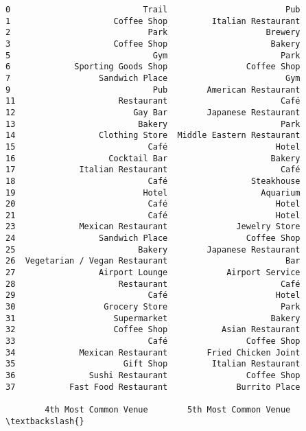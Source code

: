 \documentclass[11pt]{article}
\begin{document}
\begin{tcolorbox}[breakable, size=fbox, boxrule=.5pt, pad at break*=1mm, opacityfill=0]
\begin{Verbatim}[commandchars=\\\{\}]
0                           Trail                        Pub
1                     Coffee Shop         Italian Restaurant
2                            Park                    Brewery
3                     Coffee Shop                     Bakery
5                             Gym                       Park
6             Sporting Goods Shop                Coffee Shop
7                  Sandwich Place                        Gym
9                             Pub        American Restaurant
11                     Restaurant                       Café
12                        Gay Bar        Japanese Restaurant
13                         Bakery                       Park
14                 Clothing Store  Middle Eastern Restaurant
15                           Café                      Hotel
16                   Cocktail Bar                     Bakery
17             Italian Restaurant                       Café
18                           Café                 Steakhouse
19                          Hotel                   Aquarium
20                           Café                      Hotel
21                           Café                      Hotel
23             Mexican Restaurant              Jewelry Store
24                 Sandwich Place                Coffee Shop
25                         Bakery        Japanese Restaurant
26  Vegetarian / Vegan Restaurant                        Bar
27                 Airport Lounge            Airport Service
28                     Restaurant                       Café
29                           Café                      Hotel
30                  Grocery Store                       Park
31                    Supermarket                     Bakery
32                    Coffee Shop           Asian Restaurant
33                           Café                Coffee Shop
34             Mexican Restaurant        Fried Chicken Joint
35                      Gift Shop         Italian Restaurant
36               Sushi Restaurant                Coffee Shop
37           Fast Food Restaurant              Burrito Place

        4th Most Common Venue        5th Most Common Venue  \textbackslash{}


\end{Verbatim}
\end{tcolorbox}
\end{document}
